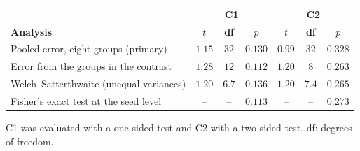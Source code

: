 \begin{tabular}{lcccccc}
\hline\hline
& \multicolumn{3}{c}{\textbf{C1}} & \multicolumn{3}{c}{\textbf{C2}} \\
\textbf{Analysis} & \textbf{$t$} & \textbf{df} & \textbf{$p$} & \textbf{$t$} & \textbf{df} & \textbf{$p$} \\
\hline
Pooled error, eight groups (primary) & $1.15$ & $32$ & $0.130$ & $0.99$ & $32$ & $0.328$ \\
Error from the groups in the contrast & $1.28$ & $12$ & $0.112$ & $1.20$ & $8$ & $0.263$ \\
Welch--Satterthwaite (unequal variances) & $1.20$ & $6.7$ & $0.136$ & $1.20$ & $7.4$ & $0.265$ \\
Fisher's exact test at the seed level & -- & -- & $0.113$ & -- & -- & $0.273$ \\
\hline
\end{tabular}
\par\vspace{4pt}
\parbox{0.94\linewidth}{\footnotesize C1 was evaluated with a one-sided test and C2 with a two-sided test. df: degrees of freedom.}
